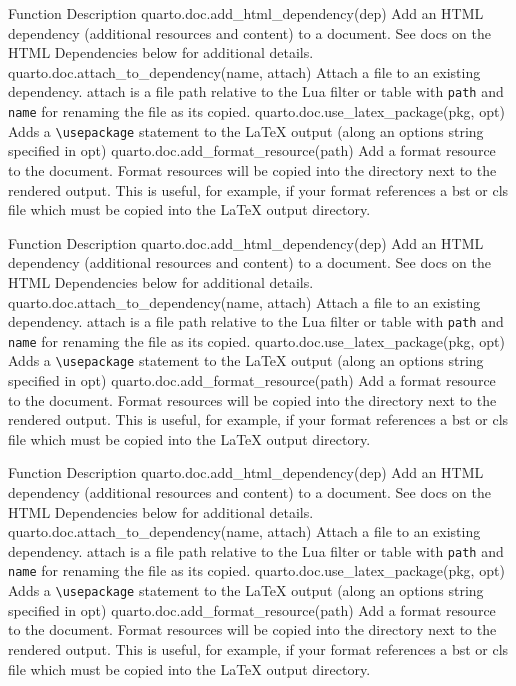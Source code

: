 \documentclass[
  letterpaper,
]{scrbook}
\begin{document}
Function Description quarto.doc.add\_html\_dependency(dep) Add an HTML
dependency (additional resources and content) to a document. See docs on
the HTML Dependencies below for additional details.
quarto.doc.attach\_to\_dependency(name, attach) Attach a file to an
existing dependency. attach is a file path relative to the Lua filter or
table with \texttt{path} and \texttt{name} for renaming the file as its
copied. quarto.doc.use\_latex\_package(pkg, opt) Adds a
\texttt{\textbackslash{}usepackage} statement to the LaTeX output (along
an options string specified in opt)
quarto.doc.add\_format\_resource(path) Add a format resource to the
document. Format resources will be copied into the directory next to the
rendered output. This is useful, for example, if your format references
a bst or cls file which must be copied into the LaTeX output directory.

Function Description quarto.doc.add\_html\_dependency(dep) Add an HTML
dependency (additional resources and content) to a document. See docs on
the HTML Dependencies below for additional details.
quarto.doc.attach\_to\_dependency(name, attach) Attach a file to an
existing dependency. attach is a file path relative to the Lua filter or
table with \texttt{path} and \texttt{name} for renaming the file as its
copied. quarto.doc.use\_latex\_package(pkg, opt) Adds a
\texttt{\textbackslash{}usepackage} statement to the LaTeX output (along
an options string specified in opt)
quarto.doc.add\_format\_resource(path) Add a format resource to the
document. Format resources will be copied into the directory next to the
rendered output. This is useful, for example, if your format references
a bst or cls file which must be copied into the LaTeX output directory.

Function Description quarto.doc.add\_html\_dependency(dep) Add an HTML
dependency (additional resources and content) to a document. See docs on
the HTML Dependencies below for additional details.
quarto.doc.attach\_to\_dependency(name, attach) Attach a file to an
existing dependency. attach is a file path relative to the Lua filter or
table with \texttt{path} and \texttt{name} for renaming the file as its
copied. quarto.doc.use\_latex\_package(pkg, opt) Adds a
\texttt{\textbackslash{}usepackage} statement to the LaTeX output (along
an options string specified in opt)
quarto.doc.add\_format\_resource(path) Add a format resource to the
document. Format resources will be copied into the directory next to the
rendered output. This is useful, for example, if your format references
a bst or cls file which must be copied into the LaTeX output directory.
\end{document}
